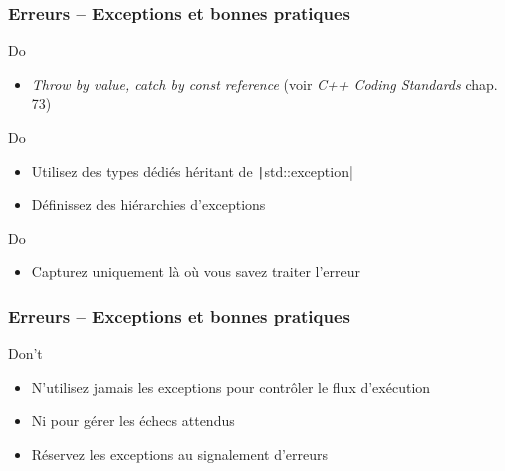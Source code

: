 \documentclass[C++.tex]{subfiles}
\begin{document}
\begin{frame}[fragile]
	\frametitle{Erreurs -- Exceptions et bonnes pratiques}
	\begin{exampleblock}{Do}
		\begin{itemize}
			\item \textit{Throw by value, catch by const reference} (voir \textit{C++ Coding Standards} chap. 73)
		\end{itemize}
	\end{exampleblock}

	\begin{exampleblock}{Do}
		\begin{itemize}
			\item Utilisez des types dédiés héritant de \texttt|std::exception|
			\item Définissez des hiérarchies d'exceptions
		\end{itemize}
	\end{exampleblock}

	\begin{exampleblock}{Do}
		\begin{itemize}
			\item Capturez uniquement là où vous savez traiter l'erreur
		\end{itemize}
	\end{exampleblock}
\end{frame}

\begin{frame}[fragile]
	\frametitle{Erreurs -- Exceptions et bonnes pratiques}
	\begin{alertblock}{Don't}
		\begin{itemize}
			\item N'utilisez jamais les exceptions pour contrôler le flux d'exécution
			\item Ni pour gérer les \og échecs attendus\fg{}
			\item Réservez les exceptions au signalement d'erreurs
		\end{itemize}
	\end{alertblock}
\end{frame}
\end{document}
